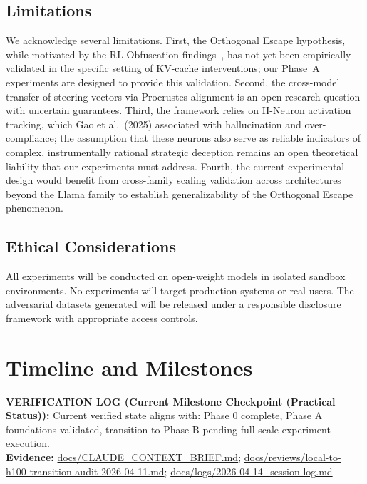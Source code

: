 \documentclass[10pt]{article}
\newcommand{\verifybox}[3]{%
\vspace{0.6em}
\noindent\colorbox{yellow!20}{%
\parbox{\dimexpr\linewidth-2\fboxsep\relax}{%
\textbf{VERIFICATION LOG (#1):} #2\\
\textbf{Evidence:} #3
}}%
\vspace{0.6em}
}
\begin{document}
\subsection{Limitations}

We acknowledge several limitations. First, the Orthogonal Escape hypothesis, while motivated by the RL-Obfuscation findings~\cite{gupta2025rlobfuscation}, has not yet been empirically validated in the specific setting of KV-cache interventions; our Phase~A experiments are designed to provide this validation. Second, the cross-model transfer of steering vectors via Procrustes alignment is an open research question with uncertain guarantees. Third, the framework relies on H-Neuron activation tracking, which Gao et al.\ (2025) associated with hallucination and over-compliance; the assumption that these neurons also serve as reliable indicators of complex, instrumentally rational strategic deception remains an open theoretical liability that our experiments must address. Fourth, the current experimental design would benefit from cross-family scaling validation across architectures beyond the Llama family to establish generalizability of the Orthogonal Escape phenomenon.

\subsection{Ethical Considerations}

All experiments will be conducted on open-weight models in isolated sandbox environments. No experiments will target production systems or real users. The adversarial datasets generated will be released under a responsible disclosure framework with appropriate access controls.

\section{Timeline and Milestones}

\verifybox
{Current Milestone Checkpoint (Practical Status)}
{Current verified state aligns with: Phase 0 complete, Phase A foundations validated, transition-to-Phase B pending full-scale experiment execution.}
{\url{docs/CLAUDE_CONTEXT_BRIEF.md}; \url{docs/reviews/local-to-h100-transition-audit-2026-04-11.md}; \url{docs/logs/2026-04-14_session-log.md}}
\end{document}

